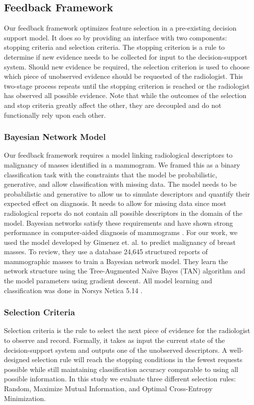 \subsection{Feedback Framework}
Our feedback framework optimizes feature selection in a pre-existing decision support model. It does so by providing an interface with two components: stopping criteria and selection criteria. The stopping criterion is a rule to determine if new evidence needs to be collected for input to the decision-support system. Should new evidence be required, the selection criterion is used to choose which piece of unobserved evidence should be requested of the radiologist. This two-stage process repeats until the stopping criterion is reached or the radiologist has observed all possible evidence. Note that while the outcomes of the selection and stop criteria greatly affect the other, they are decoupled and do not functionally rely upon each other.

\subsubsection{Bayesian Network Model}
Our feedback framework requires a model linking radiological descriptors to malignancy of masses identified in a mammogram. We framed this as a binary classification task with the constraints that the model be probabilistic, generative, and allow classification with missing data. The model needs to be probabilistic and generative to allow us to simulate descriptors and quantify their expected effect on diagnosis. It needs to allow for missing data since most radiological reports do not contain all possible descriptors in the domain of the model. Bayesian networks satisfy these requirements and have shown strong performance in computer-aided diagnosis of mammograms \cite{Burnside:2000wl, ElizabethS:2005gc, Rubin:2005jg, Koller:2009wk, Burnside:2009br}. 
For our work, we used the model developed by Gimenez et. al. \cite{Gimenez:2014tr} to predict malignancy of breast masses. To review, they use a database 24,645 structured reports of mammographic masses to train a Bayesian network model. They learn the network structure using the Tree-Augmented Na\"{i}ve Bayes (TAN) algorithm and the model parameters using gradient descent. All model learning and classification was done in Norsys Netica 5.14 \cite{Norsys:1998vl}.


\subsubsection{Selection Criteria}
Selection criteria is the rule to select the next piece of evidence for the radiologist to observe and record. Formally, it takes as input the current state of the decision-support system and outputs one of the unobserved descriptors. A well-designed selection rule will reach the stopping conditions in the fewest requests possible while still maintaining classification accuracy comparable to using all possible information. In this study we evaluate three different selection rules: Random, Maximize Mutual Information, and Optimal Cross-Entropy Minimization. \\

